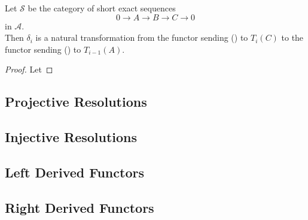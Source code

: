 \begin{exercise}
	Let $\mathcal{S}$ be the category of short exact sequences
	\begin{equation}
		0 \rightarrow A \rightarrow B \rightarrow C \rightarrow 0 \tag{\textasteriskcentered}
	\end{equation}
	in $\mathcal{A}$. \\
	Then $\delta_i$ is a natural transformation from the functor sending (\textasteriskcentered) to $T_i(C)$ to the functor sending (\textasteriskcentered) to $T_{i-1}(A)$.
\end{exercise}

\begin{proof}
	Let 
\end{proof}

\subsection{Projective Resolutions}

\subsection{Injective Resolutions}

\subsection{Left Derived Functors}

\subsection{Right Derived Functors}